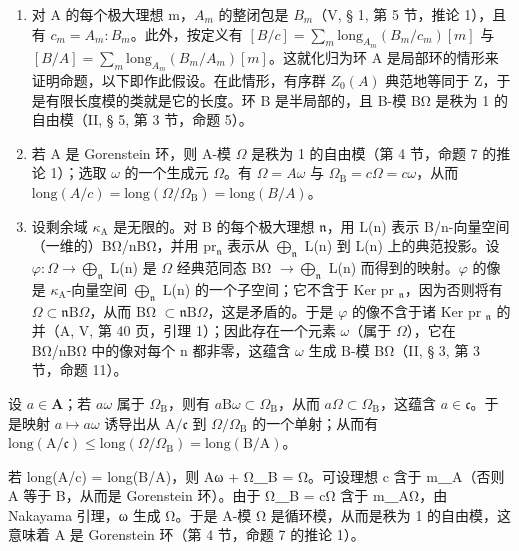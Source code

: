 \begin{enumerate}
\def\labelenumi{\Alph{enumi})}
\item
  对 A 的每个极大理想 m，\(A_{m}\) 的整闭包是 \(B_{m}\)（V, § 1, 第 5 节，推论 1），且有 \(c_{m} = A_{m} : B_{m}\)。此外，按定义有 \([B/c] = \sum_{m} \text{long}_{A_{m}}(B_{m}/c_{m})[m]\) 与 \([B/A] = \sum_{m} \text{long}_{A_{m}}(B_{m}/A_{m})[m]\)。这就化归为环 A 是局部环的情形来证明命题，以下即作此假设。在此情形，有序群 \(Z_{0}(A)\) 典范地等同于 Z，于是有限长度模的类就是它的长度。环 B 是半局部的，且 B-模 BΩ 是秩为 1 的自由模（II, § 5, 第 3 节，命题 5）。
\item
  若 A 是 Gorenstein 环，则 A-模 \(\Omega\) 是秩为 1 的自由模（第 4 节，命题 7 的推论 1）；选取 \(\omega\) 的一个生成元 \(\Omega\)。有 \(\Omega = A\omega\) 与 \(\Omega_{\mathrm{B}} = c\Omega = c\omega\)，从而 \(\text{long}(A/c) = \text{long}(\Omega/\Omega_{\mathrm{B}}) = \text{long}(B/A)\)。
\item
  设剩余域 \(\kappa_{\mathrm{A}}\) 是无限的。对 B 的每个极大理想 \(\mathfrak{n}\)，用 L(n) 表示 B/n-向量空间（一维的）BΩ/nBΩ，并用 pr\(_{\mathfrak{n}}\) 表示从 \(\bigoplus_{\mathfrak{n}}\) L(n) 到 L(n) 上的典范投影。设 \(\varphi : \Omega \longrightarrow \bigoplus_{\mathfrak{n}}\) L(n) 是 \(\Omega\) 经典范同态 BΩ \(\longrightarrow \bigoplus_{\mathfrak{n}}\) L(n) 而得到的映射。\(\varphi\) 的像是 \(\kappa_{\mathrm{A}}\)-向量空间 \(\bigoplus_{\mathfrak{n}}\) L(n) 的一个子空间；它不含于 Ker pr \(_{\mathfrak{n}}\)，因为否则将有 \(\Omega \subset \mathfrak{n}\mathrm{B}\Omega\)，从而 BΩ \(\subset \mathfrak{n}\mathrm{B}\Omega\)，这是矛盾的。于是 \(\varphi\) 的像不含于诸 Ker pr \(_{\mathfrak{n}}\) 的并（A, V, 第 40 页，引理 1）；因此存在一个元素 \(\omega\)（属于 \(\Omega\)），它在 BΩ/nBΩ 中的像对每个 n 都非零，这蕴含 \(\omega\) 生成 B-模 BΩ（II, § 3, 第 3 节，命题 11）。
\end{enumerate}

设 \(a \in \mathbf{A}\)；若 \(a\omega\) 属于 \(\Omega_{\mathrm{B}}\)，则有 \(a\mathrm{B}\omega \subset \Omega_{\mathrm{B}}\)，从而 \(a\Omega \subset \Omega_{\mathrm{B}}\)，这蕴含 \(a \in \mathfrak{c}\)。于是映射 \(a \mapsto a\omega\) 诱导出从 \(\mathrm{A}/\mathfrak{c}\) 到 \(\Omega/\Omega_{\mathrm{B}}\) 的一个单射；从而有 \(\mathrm{long}(\mathrm{A}/\mathfrak{c}) \leqslant \mathrm{long}(\Omega/\Omega_{\mathrm{B}}) = \mathrm{long}(\mathrm{B}/\mathrm{A})\)。

若 long(A/c) = long(B/A)，则 Aω + Ω＿B = Ω。可设理想 c 含于 m＿A（否则 A 等于 B，从而是 Gorenstein 环）。由于 Ω＿B = cΩ 含于 m＿AΩ，由 Nakayama 引理，ω 生成 Ω。于是 A-模 Ω 是循环模，从而是秩为 1 的自由模，这意味着 A 是 Gorenstein 环（第 4 节，命题 7 的推论 1）。

